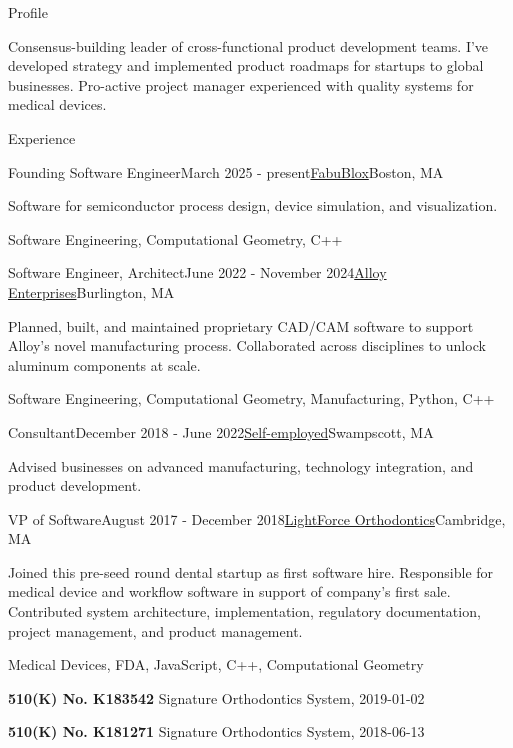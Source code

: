 \documentclass{resume}
\begin{document}
\begin{rSection}{Profile}
\item Consensus-building leader of cross-functional product development teams. I've developed strategy and implemented product roadmaps for startups to global businesses. Pro-active project manager experienced with quality systems for medical devices.
\end{rSection}

\begin{rSection}{Experience}

\begin{rSubsection}{Founding Software Engineer}{March 2025 - present}{\href{https://fabublox.com}{FabuBlox}}{Boston, MA}
\item Software for semiconductor process design, device simulation, and visualization.
\item Software Engineering, Computational Geometry, C++    
\end{rSubsection}
    
\begin{rSubsection}{Software Engineer, Architect}{June 2022 - November 2024}{\href{https://alloyenterprises.co}{Alloy Enterprises}}{Burlington, MA}
\item Planned, built, and maintained proprietary CAD/CAM software to support Alloy's novel manufacturing process. Collaborated across disciplines to unlock aluminum components at scale.
\item Software Engineering, Computational Geometry, Manufacturing, Python, C++
\end{rSubsection}

\begin{rSubsection}{Consultant}{December 2018 - June 2022}{\href{https://metatooth.com/services}{Self-employed}}{Swampscott, MA}
\item Advised businesses on advanced manufacturing, technology integration, and product development.
\end{rSubsection}

\begin{rSubsection}{VP of Software}{August 2017 - December 2018}{\href{https://lightforceortho.com}{LightForce Orthodontics}}{Cambridge, MA}
\item Joined this pre-seed round dental startup as first software hire. Responsible for medical device and workflow software in support of company's first sale. Contributed system architecture, implementation, regulatory documentation, project management, and product management.
\item Medical Devices, FDA, JavaScript, C++, Computational Geometry
\item \textbf{510(K) No. K183542} Signature Orthodontics System, 2019-01-02
\item \textbf{510(K) No. K181271} Signature Orthodontics System, 2018-06-13
\end{rSubsection}


\end{rSection}
\end{document}
